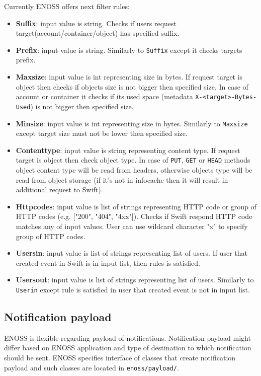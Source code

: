     Currently ENOSS offers next filter rules:
    \begin{itemize}
        \item \textbf{Suffix}: input value is string. Checks if users request target(account/container/object) has specified suffix.
        \item \textbf{Prefix}: input value is string. Similarly to \texttt{Suffix} except it checks targets prefix.
        \item \textbf{Maxsize}: input value is int representing size in bytes. If request target is object then checks if objects size is not bigger then specified size. In case of account or container it checks if its used space (metadata \texttt{X-<target>-Bytes-Used}) is not bigger then specified size.
        \item \textbf{Minsize}: input value is int representing size in bytes. Similarly to \texttt{Maxsize} except target size must not be lower then specified size.
        \item \textbf{Contenttype}: input value is string representing content type. If request target is object then check object type. In case of \texttt{PUT}, \texttt{GET} or \texttt{HEAD} methods object content type will be read from headers, otherwise objects type will be read from object storage (if it's not in infocache then it will result in additional request to Swift).
        \item \textbf{Httpcodes}: input value is list of strings representing HTTP code or group of HTTP codes (e.g. ["200", "404", "4xx"]). Checks if Swift respond HTTP code matches any of input values. User can use wildcard character "x" to specify group of HTTP codes.
        \item \textbf{Usersin}: input value is list of strings representing list of users. If user that created event in Swift is in input list, then rules is satisfied.
        \item \textbf{Usersout}: input value is list of strings representing list of users. Similarly to \texttt{Userin} except rule is satisfied in user that created event is not in input list.
    \end{itemize}

    \subsection{Notification payload}
    ENOSS is flexible regarding payload of notifications. Notification payload might differ based on ENOSS application and type of destination to which notification should be sent. ENOSS specifies interface of classes that create notification payload and such classes are located in \texttt{enoss/payload/}.

